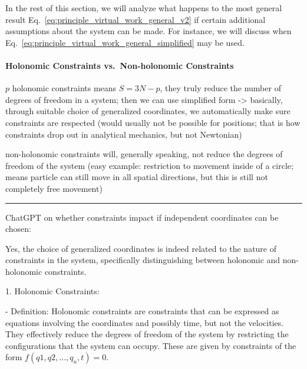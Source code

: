 \documentclass[../class_mech_main.tex]{subfiles}
\begin{document}



In the rest of this section, we will analyze what happens to the most general result Eq.~\eqref{eq:principle_virtual_work_general_v2} if certain additional assumptions about the system can be made. For instance, we will discuss when Eq.~\eqref{eq:principle_virtual_work_general_simplified} may be used.



			\paragraph{Holonomic Constraints vs.~Non-holonomic Constraints}


$p$ holonomic constraints means $S = 3N - p$, they truly reduce the number of degrees of freedom in a system; then we can use simplified form -> basically, through suitable choice of generalized coordinates, we automatically make sure constraints are respected (would usually not be possible for positions; that is how constraints drop out in analytical mechanics, but not Newtonian)


non-holonomic constraints will, generally speaking, not reduce the degrees of freedom of the system (easy example: restriction to movement inside of a circle; means particle can still move in all spatial directions, but this is still not completely free movement)


\hrule


ChatGPT on whether constraints impact if independent coordinates can be chosen:

Yes, the choice of generalized coordinates is indeed related to the nature of constraints in the system, specifically distinguishing between holonomic and non-holonomic constraints.

1. Holonomic Constraints:

   - Definition: Holonomic constraints are constraints that can be expressed as equations involving the coordinates and possibly time, but not the velocities. They effectively reduce the degrees of freedom of the system by restricting the configurations that the system can occupy. These are given by constraints of the form \(f(q1, q2, \ldots, q_n, t) = 0\).
\end{document}
